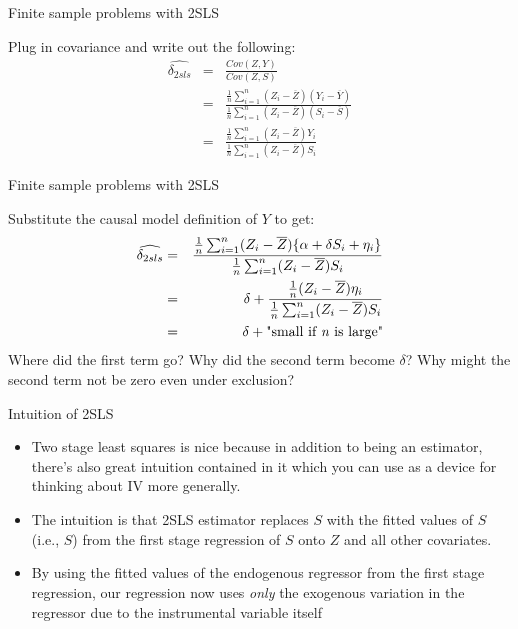 \documentclass{beamer}
\begin{document}
\begin{frame}{Finite sample problems with 2SLS}

Plug in covariance and write out the following:
		\begin{eqnarray*}
		\widehat{\delta_{2sls}} &=& \frac{Cov(Z,Y)}{Cov(Z,S)} \\
		&=& \frac{ \frac{1}{n}\sum_{i=1}^n(Z_i - \overline{Z})(Y_i - \overline{Y})}{\frac{1}{n}\sum_{i=1}^n(Z_i - \overline{Z})(S_i - \overline{S})} \\
		&=& \frac{ \frac{1}{n} \sum_{i=1}^n(Z_i - \overline{Z})Y_i}{ \frac{1}{n} \sum_{i=1}^n (Z_i-\overline{Z})S_i}
		\end{eqnarray*}

\end{frame}

\begin{frame}{Finite sample problems with 2SLS}

Substitute the causal model definition of $Y$ to get:
		\begin{eqnarray*}
		\widehat{\delta_{2sls} }&=& \frac{ \frac{1}{n} \sum_{i=1}^n (Z_i -\overline{Z})\{ \alpha + \delta{S}_i + \eta_i \}}{\frac{1}{n} \sum_{i=1}^n (Z_i - \overline{Z})S_i} \\
		&=& \delta + \frac{\frac{1}{n} (Z_i - \overline{Z})\eta_i}{\frac{1}{n}\sum_{i=1}^n(Z_i - \overline{Z})S_i} \\
		&=& \delta + \text{"small if \emph{n} is large"}
		\end{eqnarray*}Where did the first term go? Why did the second term become $\delta$? Why might the second term not be zero even under exclusion?

\end{frame}	


\begin{frame}{Intuition of 2SLS}
	
	\begin{itemize}
	\item Two stage least squares is nice because in addition to being an estimator, there's also great intuition contained in it which you can use as a device for thinking about IV more generally. 
	\item The intuition is that 2SLS estimator replaces $S$ with the fitted values of $S$ (i.e., $\widehat{S}$) from the first stage regression of $S$ onto $Z$ and all other covariates.  
	\item By using the fitted values of the endogenous regressor from the first stage regression, our regression now uses \emph{only} the exogenous variation in the regressor due to the instrumental variable itself
	\end{itemize}
\end{frame}
\end{document}
